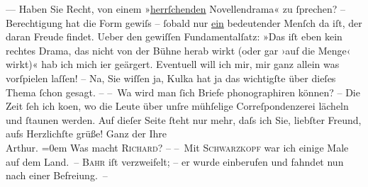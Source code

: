 \begin{ledgroupsized}[t]{13cm}
                    ––\pend
           \pstart
           Haben Sie Recht, von einem »\uline{herrſchenden}
                    Novellendrama« zu ſprechen? – Berechtigung hat die Form gewiſs – ſobald nur \uline{ein} bedeutender Menſch da iſt, der daran Freude
                    findet. Ueber den gewiſſen Fundamentalſatz: »Das iſt eben kein rechtes Drama,
                    das nicht von der Bühne herab wirkt (oder gar ›auf die Menge‹ wirkt)« hab ich {\pb}mich
                        i{\geminationm}er geärgert. Eventuell will ich mir, mir ganz
                    allein was vorſpielen laſſen! – Na, Sie wiſſen ja, Kulka hat ja das wichtigſte über dieſes Thema ſchon gesagt.
                    –\pend
           \pstart
           – Wa{\geminationn} wird man ſich Briefe phonographiren können? –
                    Die Zeit ſeh ich ko{\geminationm}en, wo die Leute über unſre
                    mühſelige Correſpondenzerei lächeln und ſtaunen werden.\pend
           \pstart
           {\pb}Auf dieſer Seite ſteht nur mehr, daſs ich Sie,
                    liebſter Freund, aufs Herzlichſte grüße!\pend
           \pstart
           Ganz der Ihre{\\[\baselineskip]}\spacefill\mbox{Arthur.}\pend
           \leftskip=0em{}\pstart
           \noindent{}Was macht \textsc{Richard}? –\pend
           \pstart
           – Mit \textsc{Schwarzkopf} war ich einige Male auf dem Land. –\pend
           \pstart
           \textsc{Bahr} iſt verzweifelt; – er wurde einberufen und fahndet nun nach
                        einer Befreiung. –\pend
           \endnumbering{}\end{ledgroupsized}  \newcommand{\dateiname}{L00112}\newcommand{\titel}{Arthur Schnitzler an Hugo von Hofmannsthal, [6. 8. 1892]}\newcommand{\editorInnen}{ Martin Anton Müller und Gerd-Hermann Susen}
      